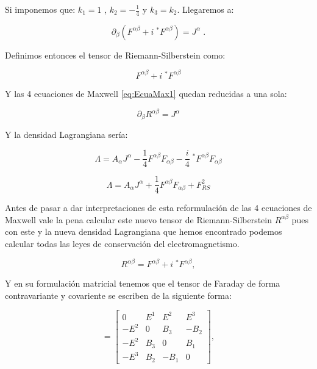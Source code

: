         Si imponemos que: $k_1 = 1$ , $k_2 = -\frac{1}{4}$ y $k_3 = k_2$. Llegaremos a:

        \begin{equation}\label{eq:EcuaMax1}
            \partial_{\beta}(F^{\alpha\beta} + i\;^*F^{\alpha\beta}) = J^{\alpha}\;.
        \end{equation}

        Definimos entonces el tensor de Riemann-Silberstein como:

        \begin{equation}\label{eq:TR}
            F^{\alpha\beta} + i\;^*F^{\alpha\beta} 
        \end{equation}

        Y las 4 ecuaciones de Maxwell \ref{eq:EcuaMax1} quedan reducidas a una sola:

        \begin{equation}\label{eq:EcuaMax2}
            \partial_{\beta}R^{\alpha\beta} = J^{\alpha}
        \end{equation}

        Y la densidad Lagrangiana sería:

        \begin{equation*}
            \Lambda = A_{\alpha}J^{\alpha} - \frac{1}{4}F^{\alpha\beta}F_{\alpha\beta} -\frac{i}{4}\;^*F^{\alpha\beta}F_{\alpha\beta}
        \end{equation*}

        \begin{equation}
            \Lambda = A_{\alpha}J^{\alpha} + \frac{1}{4}F^{\alpha\beta}F_{\alpha\beta} + F_{RS}^2
        \end{equation}

        Antes de pasar a dar interpretaciones de esta reformulación de las 4 ecuaciones de Maxwell vale la pena calcular este nuevo tensor de Riemann-Silberstein $R^{\alpha\beta}$ pues con este y la nueva densidad Lagrangiana que hemos encontrado podemos calcular todas las leyes de conservación del electromagnetismo.

        \begin{equation}
            R^{\alpha\beta} = F^{\alpha\beta} + i\;^*F^{\alpha\beta},
        \end{equation}

        Y en su formulación matricial tenemos que el tensor de Faraday de forma contravariante y covariente se escriben de la siguiente forma:

        \begin{equation}
            [F^{\alpha\beta}]=
            \begin{bmatrix}
                0 & E^1 & E^2 & E^3 \\
                -E^2 & 0 & B_3 & -B_2 \\
                -E^2 & B_3 & 0 & B_1 \\
                -E^3 & B_2 & -B_1 & 0
            \end{bmatrix},
        \end{equation}

